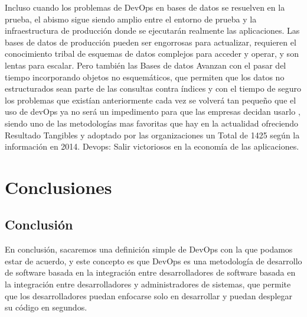 \documentclass[preprint,12pt]{elsarticle}
\begin{document}
Incluso cuando los problemas de DevOps en bases de datos se resuelven en la prueba, el abismo sigue siendo amplio entre el entorno de prueba y la infraestructura de producción donde se ejecutarán realmente las aplicaciones. Las bases de datos de producción pueden ser engorrosas para actualizar, requieren el conocimiento tribal de esquemas de datos complejos para acceder y operar, y son lentas para escalar. Pero también las Bases de datos Avanzan con el pasar del tiempo incorporando objetos no esquemáticos, que permiten que los datos no estructurados sean parte de las consultas contra índices y con el tiempo de seguro los problemas que existían anteriormente cada vez se volverá tan pequeño que el uso de devOps ya no será un impedimento para que las empresas decidan usarlo , siendo uno de las metodologías mas favoritas que hay en la actualidad ofreciendo Resultado Tangibles y adoptado por las organizaciones un Total de 1425 según la información en 2014. Devops: Salir victoriosos en la economía de las aplicaciones.\cite{referenciaSandoval2}




\section{Conclusiones}
\subsection{Conclusión }	
En conclusión, sacaremos una definición simple de DevOps con la que podamos estar de acuerdo, y este concepto es que DevOps es una metodología de desarrollo de software basada en la integración entre desarrolladores de software basada en la integración entre desarrolladores y administradores de sistemas, que permite que los desarrolladores puedan enfocarse solo en desarrollar y puedan desplegar su código en segundos.


	
	

	
	\newpage
	
		 
\citep{referenciarobles2}  
\citep{referenciarobles1}   
\citep{referenciaSandoval1} 
\citep{referenciaSandoval2}     

	
\end{document}
